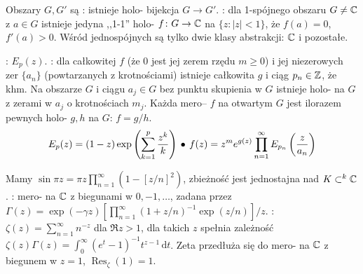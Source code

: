 Obszary  $G, G'$ są : istnieje holo- bijekcja $G \to G'$.
: dla 1-spójnego obszaru $G \neq \mathbb{C}$ z $a \in G$ istnieje jedyna ,,1-1'' holo- $f \colon G \to \mathbb{C}$ na $\{z : |z| <1\}$, że $f(a) = 0$, $f'(a) > 0$.
Wśród jednospójnych są tylko dwie klasy abstrakcji: $\mathbb{C}$ i pozostałe.



:  $E_p(z)$.
: dla całkowitej $f$ (że $0$ jest jej zerem rzędu $m \ge 0$) i jej niezerowych zer $\{a_n\}$ (powtarzanych z krotnościami) istnieje całkowita $g$ i ciąg $p_n \in \mathbb{Z}$, że khm.
Na obszarze $G$ i ciągu $a_j \in G$ bez punktu skupienia w $G$ istnieje holo- na $G$ z zerami w $a_j$ o krotnościach $m_j$.
Każda mero-- $f$ na otwartym $G$ jest ilorazem pewnych holo- $g, h $ na $G$: $f = g/h$.
\[
	E_p(z) = (1-z)\exp\left(\sum_{k=1}^p \frac{z^k}{k} \right) \, \bullet \,
	f(z) = z^m e^{g(z)} \prod_{n=1}^\infty E_{p_n} \left(\frac{z}{a_n} \right) 
\]

Mamy  $\sin \pi z = \pi z \prod_{n=1}^\infty (1-[z/n]^2)$, zbieżność jest jednostajna nad $K \subset^k \mathbb{C}$.
: mero- na $\mathbb{C}$ z biegunami w $0, -1, \dots$, zadana przez $\Gamma(z) = \exp(-\gamma z) [\prod_{n=1}^\infty (1+z/n)^{-1} \exp(z/n)]/z$.
: $\zeta(z) = \sum_{n=1}^\infty n^{-z}$ dla $\Re z > 1$, dla takich $z$ spełnia zależność $\zeta (z) \Gamma(z) = \int_0^\infty (e^t - 1)^{-1} t^{z-1} \, \textrm{d}t$.
Zeta przedłuża się do mero- na $\mathbb{C}$ z biegunem w $z = 1$, $\operatorname{Res}_\zeta (1) = 1$.